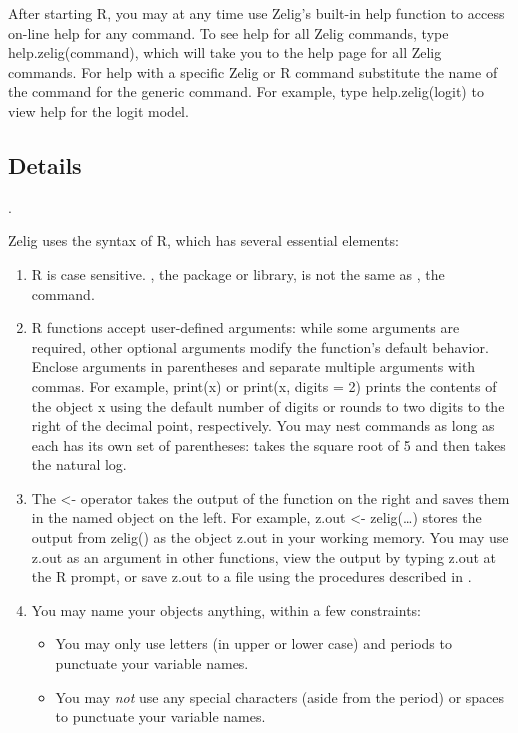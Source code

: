 \documentclass[letterpaper,10pt,english]{sphinxmanual}
\begin{document}
After starting R, you may at any time use Zelig’s built-in help function
to access on-line help for any command. To see help for all Zelig
commands, type help.zelig(command), which will take you to the help page
for all Zelig commands. For help with a specific Zelig or R command
substitute the name of the command for the generic command. For example,
type help.zelig(logit) to view help for the logit model.


\subsection{Details}
\label{3_data_analysis:details}
.

Zelig uses the syntax of R, which has several essential elements:
\begin{enumerate}
\item {} 
R is case sensitive. , the package or library, is not the
same as , the command.

\item {} 
R functions accept user-defined arguments: while some arguments are
required, other optional arguments modify the function’s default
behavior. Enclose arguments in parentheses and separate multiple
arguments with commas. For example, print(x) or print(x, digits = 2)
prints the contents of the object x using the default number of
digits or rounds to two digits to the right of the decimal point,
respectively. You may nest commands as long as each has its own set
of parentheses:  takes the square root of 5 and then
takes the natural log.

\item {} 
The \textless{}- operator takes the output of the function on the right and
saves them in the named object on the left. For example, z.out \textless{}-
zelig(…) stores the output from zelig() as the object z.out in your
working memory. You may use z.out as an argument in other functions,
view the output by typing z.out at the R prompt, or save z.out to a
file using the procedures described in .

\item {} 
You may name your objects anything, within a few constraints:
\begin{itemize}
\item {} 
You may only use letters (in upper or lower case) and periods to
punctuate your variable names.

\item {} 
You may \emph{not} use any special characters (aside from the period)
or spaces to punctuate your variable names.


\end{itemize}
\end{enumerate}
\end{document}

